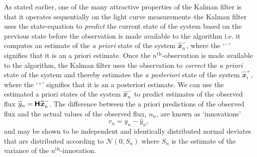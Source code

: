 \documentclass[a4paper,fleqn,usenatbib]{mnras}
\begin{document}
As stated earlier, one of the many attractive properties of the Kalman filter is that it operates sequentially on the light curve measurements--the Kalman filter uses the state-equation to \textit{predict} the current state of the system based on the previous state before the observation is made available to the algorithm i.e. it computes an estimate of the \textit{a priori} state of the system $\widehat{\mathbfit{x}}^{-}_{n}$, where the `$^{-}$' signifies that it is an a priori estimate. Once the $n^{\mathrm{th}}$-observation is made available to the algorithm, the Kalman filter uses the observation to \textit{correct} the \textit{a priori} state of the system and thereby estimates the \textit{a posteriori} state of the system $\widehat{\mathbfit{x}}^{+}_{i}$, where the `$^{+}$' signifies that it is an a posteriori estimate. We can use the estimated a priori states of the system $\widehat{\mathbfit{x}}^{-}_{n}$ to predict estimates of the observed flux $\widehat{y}_{n} = \textbf{\textsf{H}}\widehat{\textbf{\textit{x}}}^{-}_{n}$. The difference between the a priori predictions of the observed flux and the actual values of the observed flux, $n_{n}$, are known as `innovations'
\begin{equation}\label{eq:InnovationPrelim}
r_{n} = y_{n} - \widehat{y}_{n},
\end{equation}
and may be shown to be independent and identically distributed normal deviates \citep[chapter 10.2]{Simon} that are distributed according to $\mathcal{N}(0,S_{n})$ where $S_{n}$ is the estimate of the variance of the $n^{\mathrm{th}}$-innovation. 
\end{document}
